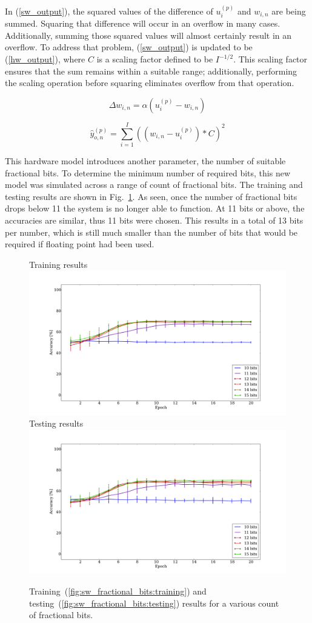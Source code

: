 \documentclass[10pt,journal]{IEEEtran}
\newcommand{\fig}[1]{Fig.~\ref{#1}}
\newcommand{\subfig}[1]{~(\ref{#1})}
\newcommand{\eq}[1]{(\ref{#1})}
\begin{document}
				In \eq{sw_output}, the squared values of the difference of \(u_i^{(p)}\) and \(w_{i,n}\) are being summed. Squaring that difference will occur in an overflow in many cases. Additionally, summing those squared values will almost certainly result in an overflow. To address that problem, \eq{sw_output} is updated to be \eq{hw_output}, where \(C\) is a scaling factor defined to be \(I^{-1/2}\). This scaling factor ensures that the sum remains within a suitable range; additionally, performing the scaling operation before squaring eliminates overflow from that operation.
				
				\begin{equation}
					\label{hw_weight_update}
					\Delta w_{i,n} = \alpha(u_i^{(p)}-w_{i,n})
				\end{equation}
				
				\begin{equation}
					\label{hw_output}
					\hat{y}_{o,n}^{(p)} = \displaystyle\sum_{i=1}^{I}((w_{i,n} - u_i^{(p)})*C)^2
				\end{equation}
				
				This hardware model introduces another parameter, the number of suitable fractional bits. To determine the minimum number of required bits, this new model was simulated across a range of count of fractional bits. The training and testing results are shown in \fig{fig:fractional_bits}. As seen, once the number of fractional bits drops below 11 the system is no longer able to function. At 11 bits or above, the accuracies are similar, thus 11 bits were chosen. This results in a total of 13 bits per number, which is still much smaller than the number of bits that would be required if floating point had been used.
				
				\begin{figure}[t!]
					\captionsetup[subfigure]{position=b}
					\centering
					\hfill
					\subcaptionbox
					{
						Training results
						\label{fig:sw_fractional_bits:training}
					}
					{\includegraphics[width=0.49\linewidth]{sw_fractional_bits_training}}
					\hfill
					\subcaptionbox
					{
						Testing results
						\label{fig:sw_fractional_bits:testing}
					}
					{\includegraphics[width=0.49\linewidth]{sw_fractional_bits_testing}}
					\hfill
					\caption{Training\subfig{fig:sw_fractional_bits:training} and testing\subfig{fig:sw_fractional_bits:testing} results for a various count of fractional bits.}
					\label{fig:fractional_bits}
				\end{figure}
		
\end{document}
